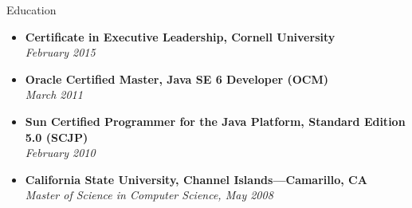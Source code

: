 \documentclass[11pt,oneside]{article}
\newenvironment{ressection}[1]{
	\vspace{4pt}
	{\fontfamily{phv}\selectfont\Large#1}
	\begin{itemize}[label={--}]
	\vspace{3pt}
}{
	\end{itemize}
}
\newcommand{\ressubitem}[1]{
	\vspace{-1pt}
	\item \begin{flushleft} #1 \end{flushleft}
}
\newcommand{\resbigitem}[3]{
	\vspace{-5pt}
	\item
	\textbf{#1}---#2 \\
	\textit{#3}
}
\newcommand{\simplebigitem}[2]{
	\vspace{-5pt}
	\item
	\textbf{#1} \\
	\textit{#2}
}
\newenvironment{ressubsec}[3]{
	\resbigitem{#1}{#2}{#3}
	\vspace{-2pt}
	\begin{itemize}
}{
	\end{itemize}
}
\newenvironment{simplesubsec}[2]{
	\simplebigitem{#1}{#2}
	\vspace{-2pt}
	
}{
	
}
\begin{document}
\begin{ressection}{Education}

	
		
	\begin{simplesubsec}{Certificate in Executive Leadership, Cornell University}{February 2015}
	\end{simplesubsec}
	
	\begin{simplesubsec}{Oracle Certified Master, Java SE 6 Developer (OCM)}{March 2011}
	\end{simplesubsec}
	\begin{simplesubsec}{Sun Certified Programmer for the Java Platform, Standard Edition 5.0 (SCJP)}{February 2010}
	\end{simplesubsec}

	\begin{comment}
	\begin{ressubsec}{University of Wisconsin-Madison}{Madison, WI}{January, 2009 - August, 2009 (special guest student)}
		\ressubitem{PhD level course on chemical reaction network theory in conjunction with Math 990 research opportunity wherein Java-based software was developed for chemical reaction graphs analysis.}
		\ressubitem{Implemented GPU-enabled protein-DNA binding analysis application.}
		\ressubitem{Co-developed poster entitled ``GPU-Enabled Analysis Of Protein-DNA Interfaces Using Structural Motifs'' presented at the MathBio 2 symposium at University of Wisconsin-Madison during November 2009.}
		\ressubitem{Wrote manuscript entitled ``SNAKE Server: Prediction of DNA binding regions on protein surfaces using structural motifs'' for future publication in \emph{Nucleic Acids Research}, Web Server issue.}
	\end{ressubsec}
	\end{comment}
	
	\begin{simplesubsec}{California State University, Channel Islands---Camarillo, CA}{Master of Science in Computer Science, May 2008}
	\end{simplesubsec}
	

\end{ressection}
\end{document}

